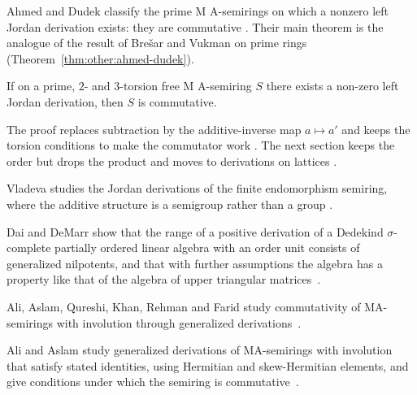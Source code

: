 Ahmed and Dudek classify the prime M A-semirings on which a nonzero
left Jordan derivation exists: they are commutative
\cite[pp.~624--631]{AhmedDudek2021}. Their main theorem is the analogue of
the result of Bre\v{s}ar and Vukman on prime rings (Theorem~\ref{thm:other:ahmed-dudek}).

\begin{theorem}\label{thm:other:ahmed-dudek}
If on a prime, $2$- and $3$-torsion free M A-semiring $S$ there exists a
non-zero left Jordan derivation, then $S$ is commutative.
\end{theorem}

The proof replaces subtraction by the additive-inverse map $a \mapsto a'$
and keeps the torsion conditions to make the commutator work
\cite[pp.~631--632]{AhmedDudek2021}. The next section keeps the order but
drops the product and moves to derivations on lattices
\cite[Definition~3.1, p.~309]{XinLiLu2008}.

Vladeva studies the Jordan derivations of the finite endomorphism semiring,
where the additive structure is a semigroup rather than a group
\cite[Abstract, p.~1]{Vladeva2017Endomorphism}.

Dai and DeMarr show that the range of a positive derivation of a Dedekind $\sigma$-complete partially ordered linear algebra with an order unit consists of generalized nilpotents, and that with further assumptions the algebra has a property like that of the algebra of upper triangular matrices~\cite{WlPositiveDerivationsOnPartially1978}.

Ali, Aslam, Qureshi, Khan, Rehman and Farid study commutativity of MA-semirings with involution through generalized derivations~\cite{WlCommutativityOfMaSemiringsWith2020}.

Ali and Aslam study generalized derivations of MA-semirings with involution that satisfy stated identities, using Hermitian and skew-Hermitian elements, and give conditions under which the semiring is commutative~\cite{WlOnCertainIdentitiesOfGeneraliz2026}.
